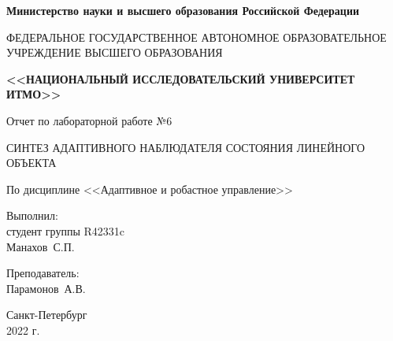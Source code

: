 \begin{titlepage}
	\begin{center}
		\begin{small}
			\textbf{Министерство науки и высшего образования Российской Федерации}

			ФЕДЕРАЛЬНОЕ ГОСУДАРСТВЕННОЕ АВТОНОМНОЕ ОБРАЗОВАТЕЛЬНОЕ УЧРЕЖДЕНИЕ ВЫСШЕГО ОБРАЗОВАНИЯ
			
			\textbf{<<НАЦИОНАЛЬНЫЙ ИССЛЕДОВАТЕЛЬСКИЙ УНИВЕРСИТЕТ ИТМО>>}
		\end{small}
		
		\vspace{8em}
		
		Отчет по лабораторной работе №6
		
		СИНТЕЗ АДАПТИВНОГО НАБЛЮДАТЕЛЯ СОСТОЯНИЯ ЛИНЕЙНОГО ОБЪЕКТА
		
		По дисциплине <<Адаптивное и робастное управление>>
	\end{center}
	
	\vspace{8em}
	
	\begin{flushright}
		Выполнил:\\
		студент группы R42331c\\
		Манахов~С.П.
		
		\vspace{1em}
		
		Преподаватель:\\
		Парамонов~А.В.
	\end{flushright}

	\vfill
	
	\begin{center}
		\small
		Санкт-Петербург\\
		2022 г.\\
	\end{center}
\end{titlepage}